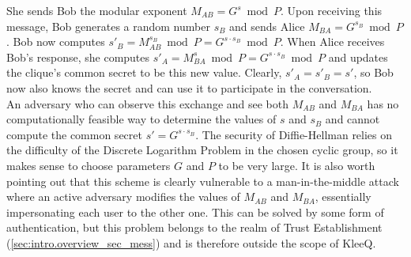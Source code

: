 \documentclass[a4paper, twoside, 12pt]{report}
\begin{document}
She sends Bob the modular exponent $M_{AB} = G^{s} \bmod P$. Upon receiving this message, Bob generates a random number $s_B$ and sends Alice $M_{BA} = G^{s_B} \bmod P$. Bob now computes $s'_B = M_{AB}^{s_B} \bmod P = G^{s \cdot s_B} \bmod P$. When Alice receives Bob's response, she computes $s'_A = M_{BA}^{s} \bmod P = G^{s \cdot s_B} \bmod P$ and updates the clique's common secret to be this new value. Clearly, $s'_A = s'_B = s'$, so Bob now also knows the secret and can use it to participate in the conversation. \\

An adversary who can observe this exchange and see both $M_{AB}$ and $M_{BA}$ has no computationally feasible way to determine the values of $s$ and $s_B$ and cannot compute the common secret $s' = G^{s \cdot s_B}$. The security of Diffie-Hellman relies on the difficulty of the Discrete Logarithm Problem in the chosen cyclic group, so it makes sense to choose parameters $G$ and $P$ to be very large. It is also worth pointing out  that this scheme is clearly vulnerable to a man-in-the-middle attack where an active adversary modifies the values of $M_{AB}$ and $M_{BA}$, essentially impersonating each user to the other one. This can be solved by some form of authentication, but this problem belongs to the realm of Trust Establishment (\cref{sec:intro.overview_sec_mess}) and is therefore outside the scope of KleeQ.
\end{document}
